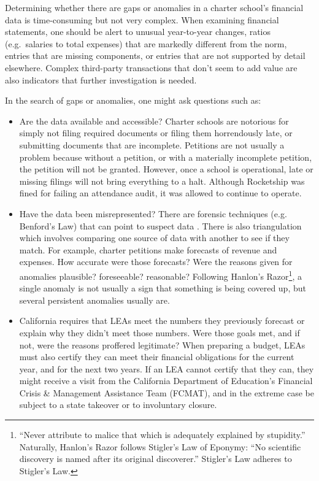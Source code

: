 Determining whether there are gaps or anomalies in a charter school's financial data is time-consuming but not very complex. When examining financial statements, one should be alert to unusual year-to-year changes, ratios (e.g. salaries to total expenses) that are markedly different from the norm, entries that are missing components, or entries that are not supported by detail elsewhere. Complex third-party transactions that don't seem to add value are also indicators that further investigation is needed.

In the search of gaps or anomalies, one might ask questions such as:
\begin{itemize}
\item Are the data available and accessible? Charter schools are notorious for simply not filing required documents or filing them horrendously late, or submitting documents that are incomplete. Petitions are not usually a problem because without a petition, or with a materially incomplete petition, the petition will not be granted. However, once a school is operational, late or missing filings will not bring everything to a halt. Although Rocketship was fined for failing an attendance audit, it was allowed to continue to operate.
  \item Have the data been misrepresented? There are forensic techniques (e.g. Benford's Law) that can point to suspect data \parencite{Zhu.etal2021}. There is also triangulation which involves comparing one source of data with another to see if they match. For example, charter petitions make forecasts of revenue and expenses. How accurate were those forecasts? Were the reasons given for anomalies plausible? foreseeable? reasonable? Following Hanlon's Razor\footnote{``Never attribute to malice that which is adequately explained by stupidity.'' Naturally, Hanlon's Razor follows Stigler's Law of Eponymy: ``No scientific discovery is named after its original discoverer.'' Stigler's Law adheres to Stigler's Law.}, a single anomaly is not usually a sign that something is being covered up, but several persistent anomalies usually are. %
  \item California requires that LEAs meet the numbers they previously forecast or explain why they didn't meet those numbers. Were those goals met, and if not, were the reasons proffered legitimate? When preparing a budget, LEAs must also certify they can meet their financial obligations for the current year, and for the next two years. If an LEA cannot certify that they can, they might receive a visit from the California Department of Education's Financial Crisis \& Management Assistance Team (FCMAT), and in the extreme case be subject to a state takeover or to involuntary closure. 
\end{itemize}%

